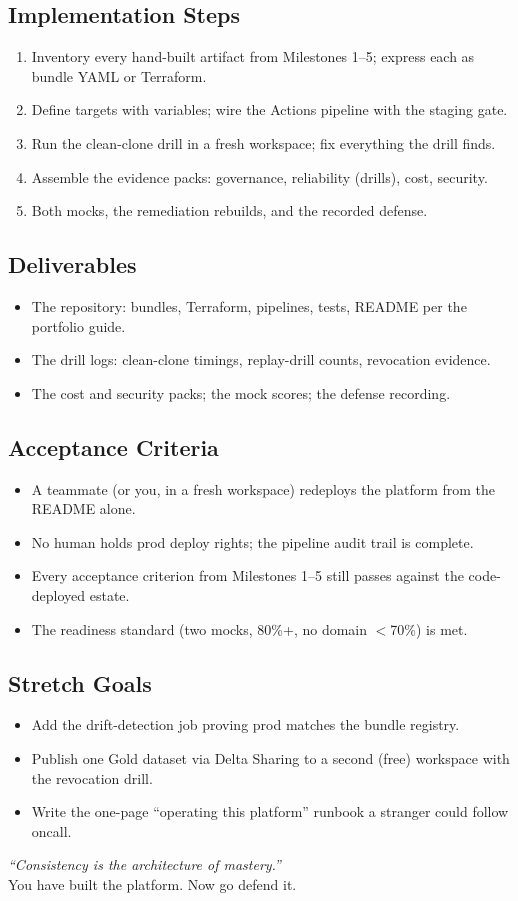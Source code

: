 \subsection*{Implementation Steps}
\begin{enumerate}
    \item Inventory every hand-built artifact from Milestones 1--5; express each as bundle YAML or Terraform.
    \item Define targets with variables; wire the Actions pipeline with the staging gate.
    \item Run the clean-clone drill in a fresh workspace; fix everything the drill finds.
    \item Assemble the evidence packs: governance, reliability (drills), cost, security.
    \item Both mocks, the remediation rebuilds, and the recorded defense.
\end{enumerate}

\subsection*{Deliverables}
\begin{itemize}
    \item The repository: bundles, Terraform, pipelines, tests, README per the portfolio guide.
    \item The drill logs: clean-clone timings, replay-drill counts, revocation evidence.
    \item The cost and security packs; the mock scores; the defense recording.
\end{itemize}

\subsection*{Acceptance Criteria}
\begin{itemize}
    \item A teammate (or you, in a fresh workspace) redeploys the platform from the README alone.
    \item No human holds prod deploy rights; the pipeline audit trail is complete.
    \item Every acceptance criterion from Milestones 1--5 still passes against the code-deployed estate.
    \item The readiness standard (two mocks, 80\%+, no domain $<$70\%) is met.
\end{itemize}

\subsection*{Stretch Goals}
\begin{itemize}
    \item Add the drift-detection job proving prod matches the bundle registry.
    \item Publish one Gold dataset via Delta Sharing to a second (free) workspace with the revocation drill.
    \item Write the one-page ``operating this platform'' runbook a stranger could follow oncall.
\end{itemize}

\vspace{4mm}
\begin{center}
    \textit{``Consistency is the architecture of mastery.''}\\[1mm]
    You have built the platform. Now go defend it.
\end{center}
